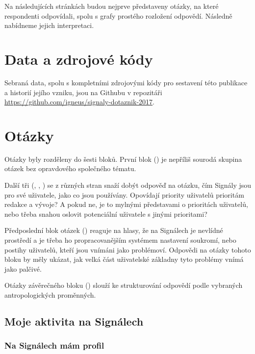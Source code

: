 \documentclass[12pt, a4paper, twoside]{article}
\begin{document}
Na následujících stránkách budou nejprve představeny otázky,
na které respondenti odpovídali, spolu s grafy prostého
rozložení odpovědí. Následně nabídneme jejich interpretaci.

\section{Data a zdrojové kódy}

Sebraná data, spolu s kompletními zdrojovými kódy pro sestavení
této publikace a historií jejího vzniku,
jsou na Githubu v repozitáři\\
\url{https://github.com/igneus/signaly-dotaznik-2017}.

\section{Otázky}

Otázky byly rozděleny do šesti bloků.
První blok ()
je nepříliš sourodá skupina otázek bez opravdového společného tématu.

Další tři
(, , )
se z různých stran snaží dobýt odpověď na otázku, čím Signály jsou
pro své uživatele, jako co jsou používány.
Opovídají priority uživatelů prioritám redakce a vývoje?
A pokud ne, je to mylnými představami o prioritách uživatelů,
nebo třeba snahou oslovit potenciální uživatele s jinými prioritami?

Předposlední blok otázek ()
reaguje na hlasy, že na Signálech je nevlídné prostředí
a je třeba ho  propracovanějším systémem nastavení
soukromí, nebo postihy uživatelů, kteří jsou vnímáni jako problémoví.
Odpovědi na otázky tohoto bloku by měly ukázat, jak velká část
uživatelské základny tyto problémy vnímá jako palčivé.

Otázky závěrečného bloku ()
slouží ke strukturování odpovědí
podle vybraných antropologických proměnných.

\vfill

\subsection{Moje aktivita na Signálech}\label{sec:mojeaktivita}

\subsubsection{Na Signálech mám profil}\label{sec:mamprofil}
\end{document}
